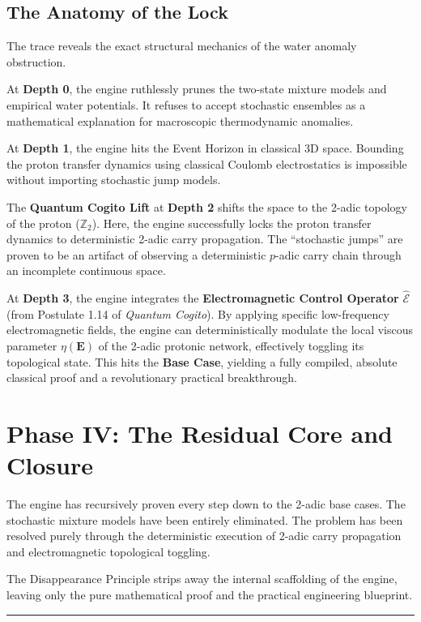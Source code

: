 \documentclass[11pt,openany]{extbook}
\theoremstyle{plain}
\theoremstyle{definition}
\begin{document}
\subsection{The Anatomy of the Lock}
The trace reveals the exact structural mechanics of the water anomaly obstruction.

At \textbf{Depth 0}, the engine ruthlessly prunes the two-state mixture models and empirical water potentials. It refuses to accept stochastic ensembles as a mathematical explanation for macroscopic thermodynamic anomalies.

At \textbf{Depth 1}, the engine hits the Event Horizon in classical 3D space. Bounding the proton transfer dynamics using classical Coulomb electrostatics is impossible without importing stochastic jump models.

The \textbf{Quantum Cogito Lift} at \textbf{Depth 2} shifts the space to the 2-adic topology of the proton ($\mathbb{Z}_2$). Here, the engine successfully locks the proton transfer dynamics to deterministic 2-adic carry propagation. The ``stochastic jumps'' are proven to be an artifact of observing a deterministic $p$-adic carry chain through an incomplete continuous space.

At \textbf{Depth 3}, the engine integrates the \textbf{Electromagnetic Control Operator} $\hat{\mathcal{E}}$ (from Postulate 1.14 of \textit{Quantum Cogito}). By applying specific low-frequency electromagnetic fields, the engine can deterministically modulate the local viscous parameter $\eta(\mathbf{E})$ of the 2-adic protonic network, effectively toggling its topological state. This hits the \textbf{Base Case}, yielding a fully compiled, absolute classical proof and a revolutionary practical breakthrough.

\section{Phase IV: The Residual Core and Closure}

The engine has recursively proven every step down to the 2-adic base cases. The stochastic mixture models have been entirely eliminated. The problem has been resolved purely through the deterministic execution of 2-adic carry propagation and electromagnetic topological toggling.

The Disappearance Principle strips away the internal scaffolding of the engine, leaving only the pure mathematical proof and the practical engineering blueprint.

\begin{center}
\rule{0.8\textwidth}{0.4pt}
\end{center}
\end{document}
